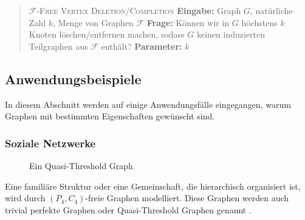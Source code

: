 \documentclass[12pt,a4paper,onecolumn,oneside,titlepage]{article}
\newcommand\cursive[1]{\ensuremath{\mathcal{#1}}}
\begin{document}
\begin{quote}
  \textsc{\cursive{F}-Free Vertex Deletion/Completion}\newline
  \textbf{Eingabe:} Graph $G$, natürliche Zahl $k$, Menge von Graphen \cursive{F}\newline
  \textbf{Frage:} Können wir in $G$ höchstens $k$ Knoten löschen/entfernen  machen, sodass $G$ keinen induzierten Teilgraphen aus \cursive{F} enthält?\newline
  \textbf{Parameter:} $k$
\end{quote}

\subsection{Anwendungsbeispiele}
\label{sec:examples}
In diesem Abschnitt werden auf einige Anwendungsfälle eingegangen, warum Graphen mit bestimmten Eigenschaften gewünscht sind.

\newpage
\subsubsection{Soziale Netzwerke}
 
\begin{figure}
  \begin{center}
    


  \end{center}
  \caption{Ein Quasi-Threshold Graph}
  \label{fig:quasi-threhold}
\end{figure}
Eine familiäre Struktur oder eine Gemeinschaft, die hierarchisch organisiert ist, wird durch $(P_4,C_4)$-freie Graphen modelliert. Diese Graphen werden auch trivial perfekte Graphen oder Quasi-Threshold Graphen genannt \cite{Wolk65}. 
\end{document}
